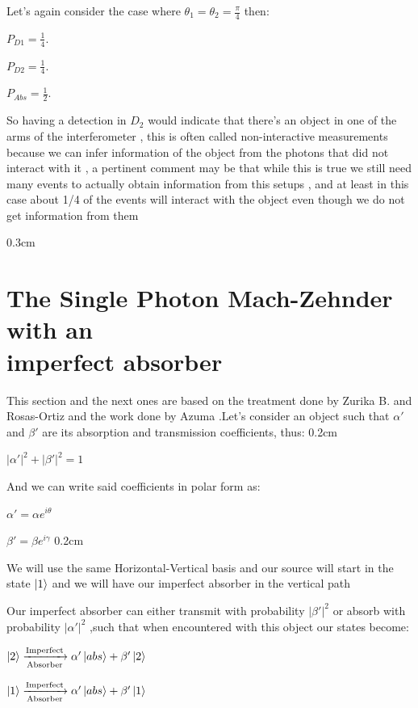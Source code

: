 \documentclass[11pt]{article}
\begin{document}
Let's again consider the case where $\theta_{1}=\theta_{2}=\frac{\pi}{4}$ then:

$P_{D1}=\frac{1}{4} $.

$P_{D2}=\frac{1}{4}$.

$P_{Abs}=\frac{1}{2}$.

So having a detection in $D_{2}$ would indicate that there's an object in one of the arms of the interferometer , this is often called non-interactive measurements because we can infer information of the object from the photons that did not interact with it , a pertinent comment may be that while this is true we still need many events to actually obtain information from this setups , and at least in this case about 1/4 of the events will interact with the object even though we do not get information from them

\vspace
{0.3cm}


\section{The Single Photon Mach-Zehnder with an  \\ imperfect absorber}

This section and the next ones are based on the treatment done by Zurika B. and Rosas-Ortiz \cite{tesis zuri} and the work done by Azuma \cite{Azuma}.Let's consider an object such that $\alpha'$ and $\beta'$ are its absorption and transmission coefficients, thus:
\vspace
{0.2cm}

$|\alpha'|^2 + |\beta'|^2 = 1$  


And we can write said coefficients in polar form as:

$\alpha'=\alpha e^{i \theta}$ 

$\beta'=\beta e^{i \gamma}$
\vspace
{0.2cm}



We will use the same Horizontal-Vertical basis and our source will start in the state $\ket{1}$ and we will have our imperfect absorber in the vertical path 

Our imperfect absorber can either transmit with probability $|\beta'|^2$ or absorb with probability $|\alpha'|^2$ ,such that when encountered with this object our states become:



$\ket{2}\xrightarrow[\text{Absorber}]{\text{Imperfect}}\alpha' \ket{abs} +\beta' \ket{2} $

$\ket{1}\xrightarrow[\text{Absorber}]{\text{Imperfect}}\alpha' \ket{abs} +\beta' \ket{1} $
\end{document}

